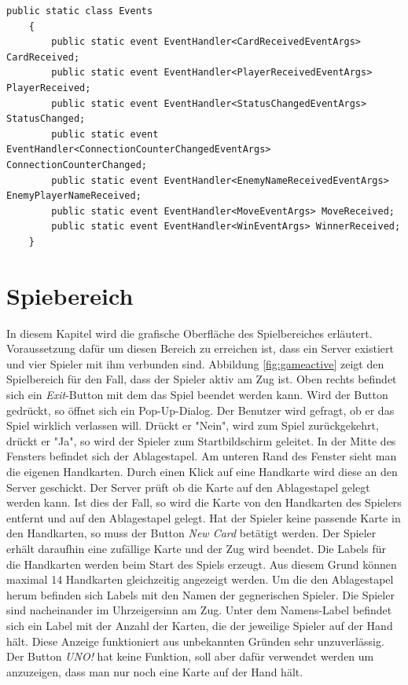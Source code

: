 \begin{lstlisting}[label=code:client-events, caption={Codeauschnitt Client Events}]
	public static class Events
	{
		public static event EventHandler<CardReceivedEventArgs> CardReceived;
		public static event EventHandler<PlayerReceivedEventArgs> PlayerReceived;
		public static event EventHandler<StatusChangedEventArgs> StatusChanged;
		public static event EventHandler<ConnectionCounterChangedEventArgs> ConnectionCounterChanged;
		public static event EventHandler<EnemyNameReceivedEventArgs> EnemyPlayerNameReceived;
		public static event EventHandler<MoveEventArgs> MoveReceived;
		public static event EventHandler<WinEventArgs> WinnerReceived;
	}	
\end{lstlisting}
\section{Spiebereich}
In diesem Kapitel wird die grafische Oberfläche des Spielbereiches erläutert. Voraussetzung dafür um diesen Bereich zu erreichen ist, dass ein Server existiert und vier Spieler mit ihm verbunden sind. Abbildung \ref{fig:gameactive} zeigt den Spielbereich für den Fall, dass der Spieler aktiv am Zug ist. Oben rechts befindet sich ein \textit{Exit}-Button mit dem das Spiel beendet werden kann. Wird der Button gedrückt, so öffnet sich ein Pop-Up-Dialog. Der Benutzer wird gefragt, ob er das Spiel wirklich verlassen will. Drückt er "Nein", wird zum Spiel zurückgekehrt, drückt er "Ja", so wird der Spieler zum Startbildschirm geleitet. In der Mitte des Fensters befindet sich der Ablagestapel. Am unteren Rand des Fenster sieht man die eigenen Handkarten. Durch einen Klick auf eine Handkarte wird diese an den Server geschickt. Der Server prüft ob die Karte auf den Ablagestapel gelegt werden kann. Ist dies der Fall, so wird die Karte von den Handkarten des Spielers entfernt und auf den Ablagestapel gelegt. Hat der Spieler keine passende Karte in den Handkarten, so muss der Button \textit{New Card} betätigt werden. Der Spieler erhält daraufhin eine zufällige Karte und der Zug wird beendet. Die Labels für die Handkarten werden beim Start des Spiels erzeugt. Aus diesem Grund können maximal 14 Handkarten gleichzeitig angezeigt werden. Um die den Ablagestapel herum befinden sich Labels mit den Namen der gegnerischen Spieler. Die Spieler sind nacheinander im Uhrzeigersinn  am Zug. Unter dem Namens-Label befindet sich ein Label mit der Anzahl der Karten, die der jeweilige Spieler auf der Hand hält. Diese Anzeige funktioniert aus unbekannten Gründen sehr unzuverlässig. Der Button \textit{UNO!} hat keine Funktion, soll aber dafür verwendet werden um anzuzeigen, dass man nur noch eine Karte auf der Hand hält. 
